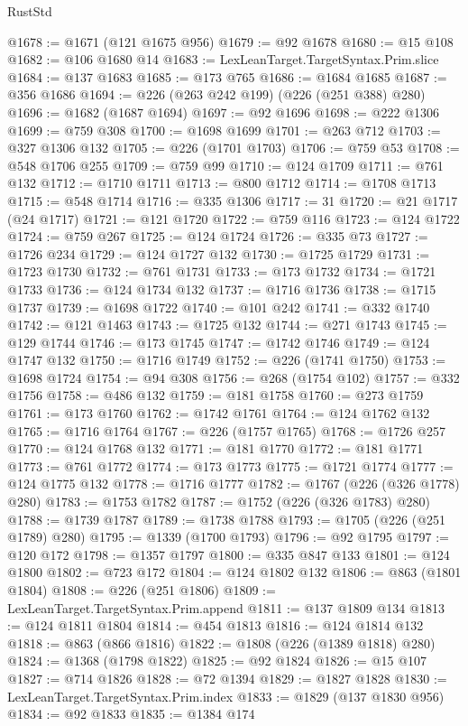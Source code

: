 \begin{lexlean}{RustStd}
\begin{coremodule}
{\begin{coremodule}
{{{{{{{{{{{{{{{{{{{{{{{{{{{{{{{{{{{{{@1678 := @1671 (@121 @1675 @956)
@1679 := @92 @1678
@1680 := @15 @108
@1682 := @106 @1680 @14
@1683 := LexLeanTarget.TargetSyntax.Prim.slice
@1684 := @137 @1683
@1685 := @173 @765
@1686 := @1684 @1685
@1687 := @356 @1686
@1694 := @226 (@263 @242 @199) (@226 (@251 @388) @280)
@1696 := @1682 (@1687 @1694)
@1697 := @92 @1696
@1698 := @222 @1306
@1699 := @759 @308
@1700 := @1698 @1699
@1701 := @263 @712
@1703 := @327 @1306 @132
@1705 := @226 (@1701 @1703)
@1706 := @759 @53
@1708 := @548 @1706 @255
@1709 := @759 @99
@1710 := @124 @1709
@1711 := @761 @132
@1712 := @1710 @1711
@1713 := @800 @1712
@1714 := @1708 @1713
@1715 := @548 @1714
@1716 := @335 @1306
@1717 := 31
@1720 := @21 @1717 (@24 @1717)
@1721 := @121 @1720
@1722 := @759 @116
@1723 := @124 @1722
@1724 := @759 @267
@1725 := @124 @1724
@1726 := @335 @73
@1727 := @1726 @234
@1729 := @124 @1727 @132
@1730 := @1725 @1729
@1731 := @1723 @1730
@1732 := @761 @1731
@1733 := @173 @1732
@1734 := @1721 @1733
@1736 := @124 @1734 @132
@1737 := @1716 @1736
@1738 := @1715 @1737
@1739 := @1698 @1722
@1740 := @101 @242
@1741 := @332 @1740
@1742 := @121 @1463
@1743 := @1725 @132
@1744 := @271 @1743
@1745 := @129 @1744
@1746 := @173 @1745
@1747 := @1742 @1746
@1749 := @124 @1747 @132
@1750 := @1716 @1749
@1752 := @226 (@1741 @1750)
@1753 := @1698 @1724
@1754 := @94 @308
@1756 := @268 (@1754 @102)
@1757 := @332 @1756
@1758 := @486 @132
@1759 := @181 @1758
@1760 := @273 @1759
@1761 := @173 @1760
@1762 := @1742 @1761
@1764 := @124 @1762 @132
@1765 := @1716 @1764
@1767 := @226 (@1757 @1765)
@1768 := @1726 @257
@1770 := @124 @1768 @132
@1771 := @181 @1770
@1772 := @181 @1771
@1773 := @761 @1772
@1774 := @173 @1773
@1775 := @1721 @1774
@1777 := @124 @1775 @132
@1778 := @1716 @1777
@1782 := @1767 (@226 (@326 @1778) @280)
@1783 := @1753 @1782
@1787 := @1752 (@226 (@326 @1783) @280)
@1788 := @1739 @1787
@1789 := @1738 @1788
@1793 := @1705 (@226 (@251 @1789) @280)
@1795 := @1339 (@1700 @1793)
@1796 := @92 @1795
@1797 := @120 @172
@1798 := @1357 @1797
@1800 := @335 @847 @133
@1801 := @124 @1800
@1802 := @723 @172
@1804 := @124 @1802 @132
@1806 := @863 (@1801 @1804)
@1808 := @226 (@251 @1806)
@1809 := LexLeanTarget.TargetSyntax.Prim.append
@1811 := @137 @1809 @134
@1813 := @124 @1811 @1804
@1814 := @454 @1813
@1816 := @124 @1814 @132
@1818 := @863 (@866 @1816)
@1822 := @1808 (@226 (@1389 @1818) @280)
@1824 := @1368 (@1798 @1822)
@1825 := @92 @1824
@1826 := @15 @107
@1827 := @714 @1826
@1828 := @72 @1394
@1829 := @1827 @1828
@1830 := LexLeanTarget.TargetSyntax.Prim.index
@1833 := @1829 (@137 @1830 @956)
@1834 := @92 @1833
@1835 := @1384 @174
}}}}}}}}}}}}}}}}}}}}}}}}}}}}}}}}}}}}}
\end{coremodule}}
\end{coremodule}
\end{lexlean}
